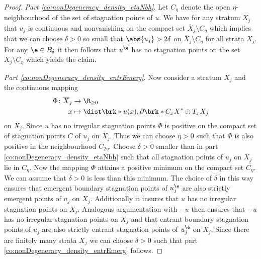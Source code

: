 \begin{proof}
  \emph{Part \ref{co:nonDegeneracy_density_etaNbh}}. 
  Let $C_\eta$ denote the open $\eta$-neighbourhood of the set of stagnation points of $u$.
  We have for any stratum $X_j$ that
  $u_j$ is continuous and nonvanishing on the compact set $\overline{X}_j\setminus C_\eta$ which implies that we can choose $\delta>0$ 
  so small that $\abs{u_j}>2\delta$ on $\overline{X}_j\setminus C_\eta$
  for all strata $X_j$.
  For any $\e\in B_\delta$ it then follows that $u^\e$ has no stagnation points on the set $\overline{X}_j\setminus C_\eta$
  which yields the claim.


  \emph{Part \ref{co:nonDegeneracy_density_entrEmerg}}.
  Now consider a stratum $X_j$ and the continuous mapping
  \begin{align*}
    \Phi\colon \overline{X}_j&\to\R_{\geq0}\\
    x&\mapsto \dist\brk*{u(x),\partial \brk*{C_xX}^*\oplus T_xX_j}
  \end{align*}
  on $\overline{X}_j$. Since $u$ has no irregular stagnation points $\Phi$ is positive on the compact set of stagnation points $C$ of $u_j$ on $\overline{X}_j$. Thus we can choose $\eta>0$
  such that $\Phi$ is also positive in the neighbourhood $C_{2\eta}$.
  Choose $\delta>0$ smaller than in part \ref{co:nonDegeneracy_density_etaNbh} such that all stagnation points of $u_j$ on $\overline{X}_j$ lie in $C_\eta$.
  Now the mapping $\Phi$ attains a positive minimum on the compact set $\overline{C_{\eta}}$.
  We can assume that $\delta>0$ is less than this minimum.
  The choice of $\delta$ in this way ensures that emergent boundary stagnation points of $u_j^\e$ are also strictly emergent points of $u_j$ on $X_j$.
  Additionally it insures that $u$ has no irregular stagnation points on $X_j$.
  Analogous argumentation with $-u$ then ensures that $-u$ has no irregular stagnation points on $X_j$ and that 
  entrant boundary stagnation points of $u_j$ are also strictly entrant stagnation points of $u_j^\e$ on $X_j$.
  Since there are finitely many strata $X_j$ we can choose $\delta>0$ such that part \ref{co:nonDegeneracy_density_entrEmerg} follows.



\end{proof}
